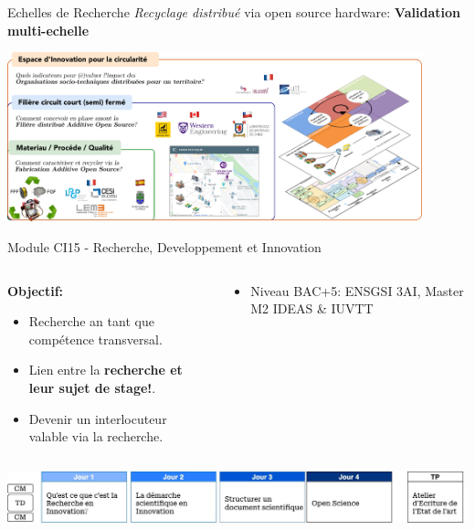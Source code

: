 \documentclass[
  11pt,
  ignorenonframetext,
  aspectratio=169,
  c]{beamer}
\providecommand{\tightlist}{%
  \setlength{\itemsep}{0pt}\setlength{\parskip}{0pt}}\usepackage{longtable,booktabs,array}
\begin{document}
\begin{frame}[t]{Echelles de Recherche}
\protect\hypertarget{echelles-de-recherche}{}
\emph{Recyclage distribué} via open source hardware: \textbf{Validation
multi-echelle}

\includegraphics[width=0.9\textwidth,height=\textheight]{Figures/slides/recherche-fabio.png}

\note{}
\end{frame}

\begin{frame}[t]{Module CI15 - Recherche, Developpement et Innovation}
\protect\hypertarget{module-ci15---recherche-developpement-et-innovation}{}
\begin{columns}[T]
\begin{column}[c]{0.5\textwidth}
\scriptsize

\textbf{Objectif:}

\begin{itemize}
\tightlist
\item
  Recherche an tant que compétence transversal.
\item
  Lien entre la \textbf{recherche et leur sujet de stage!}.
\item
  Devenir un interlocuteur valable via la recherche.
\end{itemize}
\end{column}

\begin{column}[c]{0.5\textwidth}
\scriptsize

\begin{itemize}
\tightlist
\item
  Niveau BAC+5: ENSGSI 3AI, Master M2 IDEAS \& IUVTT
\end{itemize}
\end{column}
\end{columns}

\includegraphics{figures/slides/Ensegnement-CI15.jpg}
\end{frame}
\end{document}
